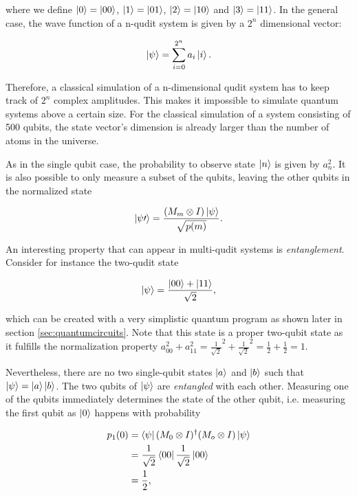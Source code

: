 where we define $\Ket{0} = \Ket{00}$, $\Ket{1} = \Ket{01}$, $\Ket{2} = \Ket{10}$
and $\Ket{3} = \Ket{11}$. In the general case, the wave function of a
n-qudit system is given by a $2^n$ dimensional vector:

\begin{equation}
  \Ket{\psi} = \sum_{i=0}^{2^n}a_i \Ket{i}.
\end{equation}

Therefore, a classical simulation of a n-dimensional qudit system has to keep
track of $2^n$ complex amplitudes. This makes it impossible to simulate quantum
systems above a certain size. For the classical simulation of a system
consisting of 500 qubits, the state vector's dimension is already larger
than the number of atoms in the universe.  

As in the single qubit case, the probability to observe state $\Ket{n}$ is
given by $a_n^2$. It is also possible to only measure a subset of the qubits,
leaving the other qubits in the normalized state

\begin{equation}
  \Ket{\psi\prime} = \frac{(M_m \otimes I) \Ket{\psi}}{\sqrt{p(m)}}.
\end{equation}

An interesting property that can appear in multi-qudit systems is
\textit{entanglement}. Consider for instance the two-qudit state

\begin{equation}
  \Ket{\psi} = \frac{\Ket{00} + \Ket{11}}{\sqrt{2}},
\end{equation}

which can be created with a very simplistic quantum program as shown later in
section \ref{sec:quantumcircuits}.
Note that this state is a proper two-qubit state as it fulfills the
normalization property
$a_{00}^2 + a_{11}^2 = \frac{1}{\sqrt{2}}^2 + \frac{1}{\sqrt{2}}^2 = \frac{1}{2}
+ \frac{1}{2} = 1$.

Nevertheless, there are no two single-qubit states $\Ket{a}$
and $\Ket{b}$ such that $\Ket{\psi} = \Ket{a} \Ket{b}$. The two qubits of
$\Ket{\psi}$ are \textit{entangled} with each other. Measuring one of the qubits
immediately determines the state of the other qubit, i.e. measuring the first
qubit as $\Ket{0}$ happens with probability

\begin{align}
  p_1(0) &= \Bra{\psi} (M_0 \otimes I)^{\dagger} (M_o \otimes I) \Ket{\psi} \\
         &= \frac{1}{\sqrt{2}} \Bra{00} \frac{1}{\sqrt{2}} \Ket{00} \\
         &= \frac{1}{2},
\end{align}

